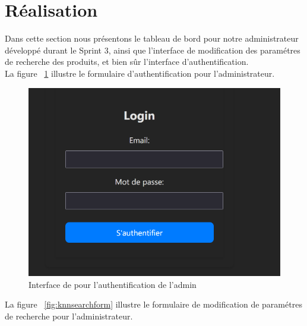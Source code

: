 \section{Réalisation}
\noindent
Dans cette section nous présentons le tableau de bord pour notre administrateur développé durant le Sprint 3, ainsi que l'interface de modification des paramétres de recherche des produits, et bien sûr l'interface d'authentification. \\

\newpage
\noindent
La figure ~\ref{fig:signin} illustre le formulaire d'authentification pour l'administrateur.

\begin{figure}[H]
    \centering
    \includegraphics[width=1\textwidth]{logos/login.png}
    \caption{Interface de pour l'authentification de l'admin}
    \label{fig:signin}
\end{figure}

\noindent
La figure ~\ref{fig:knnsearchform} illustre le formulaire de modification de paramétres de recherche pour l'administrateur.


